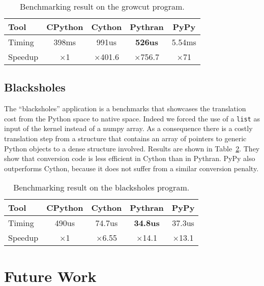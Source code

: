 \documentclass[10pt, onecolumn, preprint]{sigplanconf}
\begin{document}
\begin{table}
    \centering

    \begin{tabular}{|l|c|c|c|c|}
        \hline
     Tool    &  CPython    &   Cython     &     Pythran   &  PyPy \\
    \hline
    Timing  &  398ms   &   991us     &    \textbf{526us} &  5.54ms  \\
    \hline
    Speedup &  $\times$1         &    $\times$401.6      &    $\times$756.7   &  $\times$71    \\
    \hline
\end{tabular}
\caption{Benchmarking result on the growcut program.}
\label{tbl:growcut}

\end{table}

\subsection{Blacksholes}

The ``blacksholes'' application is a benchmarks that showcases the
translation cost from the Python space to native space. Indeed we forced the
use of a \texttt{list} as input of the kernel instead of a numpy array. As a
consequence there is a costly translation step from a structure that contains
an array of pointers to generic Python objects to a dense structure involved.
Results are shown in Table~\ref{tbl:black}. They show that conversion code is
less efficient in Cython than in Pythran. PyPy also outperforms Cython, because
it does not suffer from a similar conversion penalty.

\begin{table}
    \centering

    \begin{tabular}{|l|c|c|c|c|}
        \hline
     Tool    &  CPython    &   Cython     &     Pythran   &  PyPy \\
    \hline
    Timing  &  490us   &   74.7us     &    \textbf{34.8us} &  37.3us  \\
    \hline
    Speedup &  $\times$1         &    $\times$6.55      &    $\times$14.1   &  $\times$13.1    \\
    \hline
\end{tabular}
\caption{Benchmarking result on the blacksholes program.}
\label{tbl:black}

\end{table}

\section{Future Work}
\end{document}
